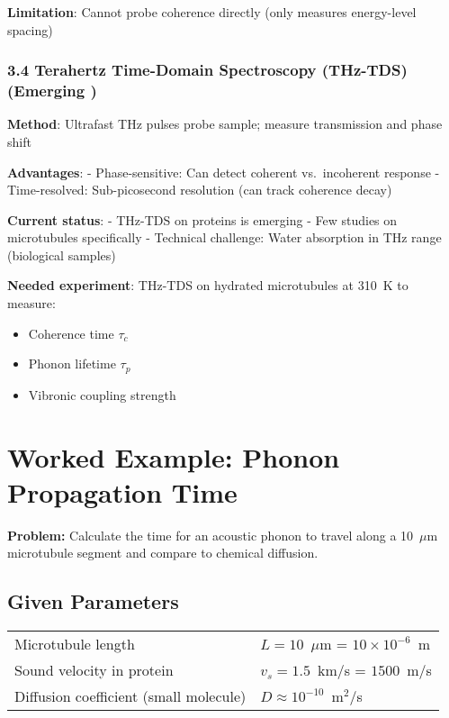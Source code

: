 \textbf{Limitation}: Cannot probe coherence directly (only measures
energy-level spacing)

\subsubsection{3.4 Terahertz Time-Domain Spectroscopy (THz-TDS)
(Emerging )}\label{terahertz-time-domain-spectroscopy-thz-tds-emerging}

\textbf{Method}: Ultrafast THz pulses probe sample; measure transmission
and phase shift

\textbf{Advantages}: - Phase-sensitive: Can detect coherent
vs.~incoherent response - Time-resolved: Sub-picosecond resolution (can
track coherence decay)

\textbf{Current status}: - THz-TDS on proteins is emerging - Few studies
on microtubules specifically - Technical challenge: Water absorption in
THz range (biological samples)

\textbf{Needed experiment}: THz-TDS on hydrated microtubules at 310~K to measure:
\begin{itemize}
\item Coherence time $\tau_c$
\item Phonon lifetime $\tau_p$
\item Vibronic coupling strength
\end{itemize}

\section{Worked Example: Phonon Propagation Time}

\textbf{Problem:} Calculate the time for an acoustic phonon to travel along a 10~$\mu$m microtubule segment and compare to chemical diffusion.

\subsection*{Given Parameters}

\begin{tabular}{@{}ll@{}}
Microtubule length & $L = 10$~$\mu$m = $10 \times 10^{-6}$~m \\
Sound velocity in protein & $v_s = 1.5$~km/s = $1500$~m/s \\
Diffusion coefficient (small molecule) & $D \approx 10^{-10}$~m$^2$/s \\
\end{tabular}

